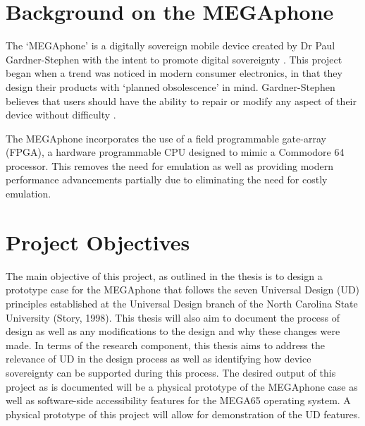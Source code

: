 
\section{Background on the MEGAphone}

The ‘MEGAphone’ is a digitally sovereign mobile device created by Dr Paul Gardner-Stephen with the intent to promote digital sovereignty \cite{mega65}.
This project began when a trend was noticed in modern consumer electronics, in that they design their products with ‘planned obsolescence’ in mind. 
Gardner-Stephen believes that users should have the ability to repair or modify any aspect of their device without difficulty \cite{mobilehistory}.

The MEGAphone incorporates the use of a field programmable gate-array (FPGA), a hardware programmable CPU designed to mimic a Commodore 64 processor. 
This removes the need for emulation as well as providing modern performance advancements partially due to eliminating the need for costly emulation.



\section{Project Objectives}

The main objective of this project, as outlined in the thesis is to design a prototype case for the MEGAphone that follows the seven Universal Design (UD) principles established at the Universal Design branch of the North Carolina State University (Story, 1998). 
This thesis will also aim to document the process of design as well as any modifications to the design and why these changes were made. 
In terms of the research component, this thesis aims to address the relevance of UD in the design process as well as identifying how device sovereignty can be supported during this process. 
The desired output of this project as is documented will be a physical prototype of the MEGAphone case as well as software-side accessibility features for the MEGA65 operating system. 
A physical prototype of this project will allow for demonstration of the UD features.
 
